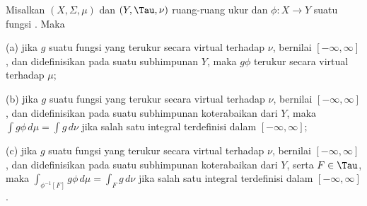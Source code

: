  Misalkan $(X,\Sigma,\mu)$ dan $(Y,\Tau,\nu)$
ruang-ruang ukur dan $\phi:X\to Y$ suatu fungsi \imp. Maka

(a) jika $g$ suatu fungsi yang terukur secara virtual terhadap $\nu$,
bernilai $[-\infty,\infty]$, dan didefinisikan pada suatu subhimpunan
$Y$, maka $g\phi$ terukur secara virtual terhadap $\mu$;

(b) jika $g$ suatu fungsi yang terukur secara virtual terhadap $\nu$,
bernilai $[-\infty,\infty]$, dan didefinisikan pada suatu subhimpunan
koterabaikan dari $Y$, maka $\int g\phi\,d\mu=\int g\,d\nu$ jika salah
satu integral terdefinisi dalam $[-\infty,\infty]$;

(c) jika $g$ suatu fungsi yang terukur secara virtual terhadap $\nu$,
bernilai $[-\infty,\infty]$, dan didefinisikan pada suatu subhimpunan
koterabaikan dari $Y$, serta $F\in\Tau$, maka
$\int_{\phi^{-1}[F]}g\phi\,d\mu=\int_Fg\,d\nu$ jika salah satu integral
terdefinisi dalam $[-\infty,\infty]$.


